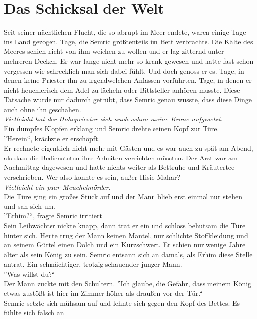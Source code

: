 \chapter{Das Schicksal der Welt}

Seit seiner nächtlichen Flucht, die so abrupt im Meer endete, waren einige Tage ins Land 
gezogen. Tage, die Semric größtenteils im Bett verbrachte. Die Kälte des Meeres schien nicht von ihm 
weichen zu wollen und er lag zitternd unter mehreren Decken. Er war lange nicht mehr so krank 
gewesen und hatte fast schon vergessen wie schrecklich man sich dabei fühlt. Und doch genoss er es. 
Tage, in denen keine Priester ihn zu irgendwelchen Anlässen vorführten. Tage, in denen er nicht 
heuchlerisch dem Adel zu lächeln oder Bittsteller anhören musste. Diese Tatsache wurde nur dadurch 
getrübt, dass Semric genau wusste, dass diese Dinge auch ohne ihn geschahen.\\
\textit{Vielleicht hat der Hohepriester sich auch schon meine Krone aufgesetzt.}\\
Ein dumpfes Klopfen erklang und Semric drehte seinen Kopf zur Türe.\\
''Herein``, krächzte er erschöpft.\\
Er rechnete eigentlich nicht mehr mit Gästen und es war auch zu spät am Abend, als dass die 
Bediensteten ihre Arbeiten verrichten müssten. Der Arzt war am Nachmittag dagewesen und hatte 
nichts 
weiter als Bettruhe und Kräutertee verschrieben. Wer also konnte es sein, außer Hisio-Mahar?\\
\textit{Vielleicht ein paar Meuchelmörder.}\\
Die Türe ging ein großes Stück auf und der Mann blieb erst einmal nur stehen und sah sich um. \\
''Erhim?``, fragte Semric irritiert.\\
Sein Leibwächter nickte knapp, dann trat er ein und schloss behutsam die Türe hinter sich. Heute 
trug der Mann keinen Mantel, nur schlichte Stoffkleidung und an seinem Gürtel einen Dolch und ein 
Kurzschwert. Er schien nur wenige Jahre älter als sein König zu sein. Semric entsann sich an 
damals, 
als Erhim diese Stelle antrat. Ein schmächtiger, trotzig schauender junger Mann. \\
''Was willst du?``\\
Der Mann zuckte mit den Schultern. ''Ich glaube, die Gefahr, dass meinem König etwas zustößt ist 
hier im Zimmer höher als draußen vor der Tür.``\\
Semric setzte sich mühsam auf und lehnte sich gegen den Kopf des Bettes. Es fühlte sich falsch an 
